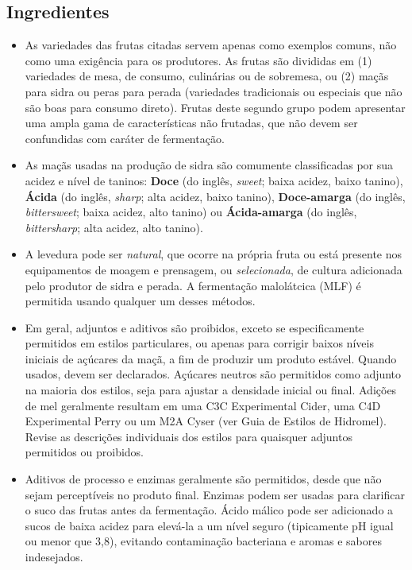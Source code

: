 \subsection*{Ingredientes}

\begin{itemize}
\item As variedades das frutas citadas servem apenas como exemplos comuns, não como uma exigência para os produtores. As frutas são divididas em (1) variedades de mesa, de consumo, culinárias ou de sobremesa, ou (2) maçãs para sidra ou peras para perada (variedades tradicionais ou especiais que não são boas para consumo direto). Frutas deste segundo grupo podem apresentar uma ampla gama de características não frutadas, que não devem ser confundidas com caráter de fermentação.
\item As maçãs usadas na produção de sidra são comumente classificadas por sua acidez e nível de taninos: \textbf{Doce} (do inglês, \textit{sweet}; baixa acidez, baixo tanino), \textbf{Ácida} (do inglês, \textit{sharp}; alta acidez, baixo tanino), \textbf{Doce-amarga} (do inglês, \textit{bittersweet}; baixa acidez, alto tanino) ou \textbf{Ácida-amarga} (do inglês, \textit{bittersharp}; alta acidez, alto tanino).
\item A levedura pode ser \textit{natural}, que ocorre na própria fruta ou está presente nos equipamentos de moagem e prensagem, ou \textit{selecionada}, de cultura adicionada pelo produtor de sidra e perada. A fermentação malolátcica (MLF) é permitida usando qualquer um desses métodos.
\item Em geral, adjuntos e aditivos são proibidos, exceto se especificamente permitidos em estilos particulares, ou apenas para corrigir baixos níveis iniciais de açúcares da maçã, a fim de produzir um produto estável. Quando usados, devem ser declarados. Açúcares neutros são permitidos como adjunto na maioria dos estilos, seja para ajustar a densidade inicial ou final. Adições de mel geralmente resultam em uma C3C Experimental Cider, uma C4D Experimental Perry ou um M2A Cyser (ver Guia de Estilos de Hidromel). Revise as descrições individuais dos estilos para quaisquer adjuntos permitidos ou proibidos.
\item Aditivos de processo e enzimas geralmente são permitidos, desde que não sejam perceptíveis no produto final. Enzimas podem ser usadas para clarificar o suco das frutas antes da fermentação. Ácido málico pode ser adicionado a sucos de baixa acidez para elevá-la a um nível seguro (tipicamente pH igual ou menor que 3,8), evitando contaminação bacteriana e aromas e sabores indesejados.

\end{itemize}

